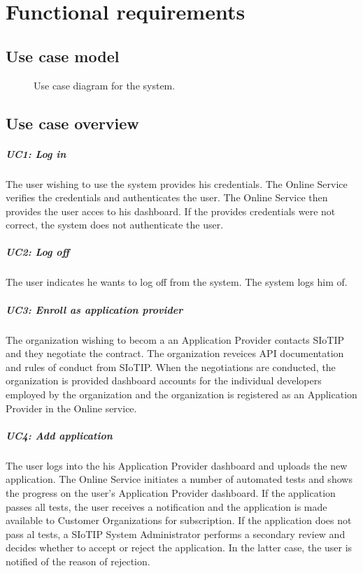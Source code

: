 \documentclass[english,peerreview]{sareport}
\begin{document}
\chapter{Functional requirements}\label{sec:functional}
\section*{Use case model}

\begin{figure}[!htp]
    \centering
    \caption{Use case diagram for the system.}\label{fig:use_case_model}
\end{figure}

\section{Use case overview}\label{sec:uc_overview}
\paragraph{UC1: Log in}
The user wishing to use the system provides his credentials.
The Online Service verifies the credentials and authenticates the user.
The Online Service then provides the user acces to his dashboard.
If the provides credentials were not correct, the system does not authenticate the user.

\paragraph{UC2: Log off}
The user indicates he wants to log off from the system.
The system logs him of.

\paragraph{UC3: Enroll as application provider}
The organization wishing to becom a an Application Provider contacts SIoTIP and they negotiate the contract. The organization reveices API documentation and rules of conduct from SIoTIP. When the negotiations are conducted, the organization is provided dashboard accounts for the individual developers employed by the organization and the organization is registered as an Application Provider in the Online service.

\paragraph{UC4: Add application}
The user logs into the his Application Provider dashboard and uploads the new application. The Online Service initiates a number of automated tests and shows the progress on the user's Application Provider dashboard. If the application passes all tests, the user receives a notification and the application is made available to Customer Organizations for subscription. If the application does not pass al tests, a SIoTIP System Administrator performs a secondary review and decides whether to accept or reject the application. In the latter case, the user is notified of the reason of rejection.
\end{document}
